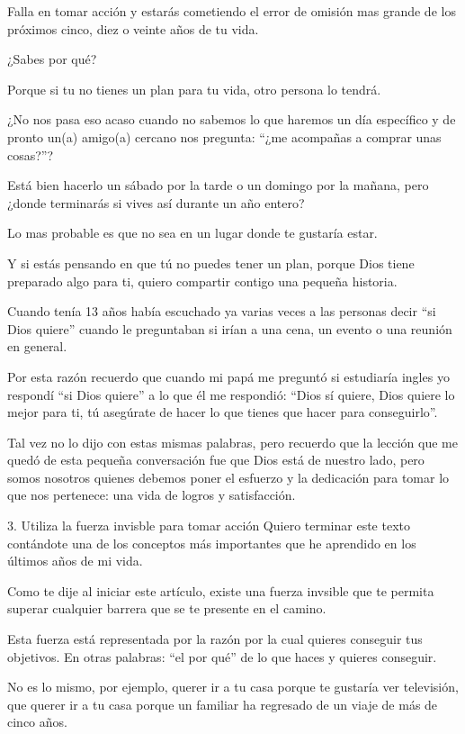 \documentclass[12pt]{book}
\begin{document}
Falla en tomar acción y estarás cometiendo el error de omisión mas grande de los próximos cinco, diez o veinte años de tu vida.

¿Sabes por qué?

Porque si tu no tienes un plan para tu vida, otro persona lo tendrá.

¿No nos pasa eso acaso cuando no sabemos lo que haremos un día específico y de pronto un(a) amigo(a) cercano nos pregunta: “¿me acompañas a comprar unas cosas?”?

Está bien hacerlo un sábado por la tarde o un domingo por la mañana, pero ¿donde terminarás si vives así durante un año entero?

Lo mas probable es que no sea en un lugar donde te gustaría estar.

Y si estás pensando en que tú no puedes tener un plan, porque Dios tiene preparado algo para ti, quiero compartir contigo una pequeña historia.

Cuando tenía 13 años había escuchado ya varias veces a las personas decir “si Dios quiere” cuando le preguntaban si irían a una cena, un evento o una reunión en general.

Por esta razón recuerdo que cuando mi papá me preguntó si estudiaría ingles yo respondí “si Dios quiere” a lo que él me respondió: “Dios sí quiere, Dios quiere lo mejor para ti, tú asegúrate de hacer lo que tienes que hacer para conseguirlo”.

Tal vez no lo dijo con estas mismas palabras, pero recuerdo que la lección que me quedó de esta pequeña conversación fue que Dios está de nuestro lado, pero somos nosotros quienes debemos poner el esfuerzo y la dedicación para tomar lo que nos pertenece: una vida de logros y satisfacción.

3. Utiliza la fuerza invisble para tomar acción
Quiero terminar este texto contándote una de los conceptos más importantes que he aprendido en los últimos años de mi vida.

Como te dije al iniciar este artículo, existe una fuerza invsible que te permita superar cualquier barrera que se te presente en el camino.

Esta fuerza está representada por la razón por la cual quieres conseguir tus objetivos. En otras palabras: “el por qué” de lo que haces y quieres conseguir.

No es lo mismo, por ejemplo, querer ir a tu casa porque te gustaría ver televisión, que querer ir a tu casa porque un familiar ha regresado de un viaje de más de cinco años.
\end{document}
